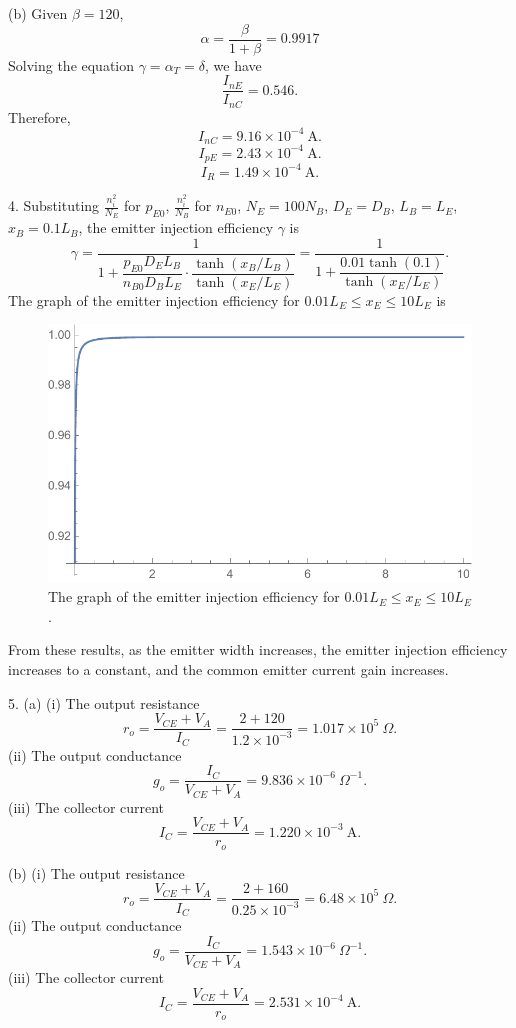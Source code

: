 \documentclass[a4paper]{article}
\begin{document}
(b) Given $\beta=120$,
$$\alpha=\frac{\beta}{1+\beta}=0.9917$$
Solving the equation $\gamma=\alpha_T=\delta$, we have
$$\frac{I_{nE}}{I_{nC}}=0.546.$$
Therefore,
$$I_{nC}=9.16\times10^{-4}\ \mathrm{A}.$$
$$I_{pE}=2.43\times10^{-4}\ \mathrm{A}.$$
$$I_R=1.49\times10^{-4}\ \mathrm{A}.$$

4. Substituting $\frac{n_i^2}{N_E}$ for $p_{E0}$, $\frac{n_i^2}{N_B}$ for $n_{E0}$, $N_E=100N_B$, $D_E=D_B$, $L_B=L_E$, $x_B=0.1L_B$, the emitter injection efficiency $\gamma$ is
$$\gamma=\frac{1}{1+\dfrac{p_{E0}D_EL_B}{n_{B0}D_BL_E}\cdot\dfrac{\tanh{(x_B/L_B)}}{\tanh{(x_E/L_E)}}}=\frac{1}{1+\dfrac{0.01\tanh{(0.1)}}{\tanh{(x_E/L_E)}}}.$$
The graph of the emitter injection efficiency for $0.01L_E\leq x_E\leq10L_E$ is
\begin{figure}[H]
    \centering
    \includegraphics[width=1\textwidth]{1.eps}
    \caption{The graph of the emitter injection efficiency for $0.01L_E\leq x_E\leq10L_E$.}
\end{figure}
From these results, as the emitter width increases, the emitter injection efficiency increases to a constant, and the common emitter current gain increases.

5. (a) (i) The output resistance
$$r_o=\frac{V_{CE}+V_A}{I_C}=\frac{2+120}{1.2\times10^{-3}}=1.017\times10^5\ \Omega.$$
(ii) The output conductance
$$g_o=\frac{I_C}{V_{CE}+V_A}=9.836\times10^{-6}\ \Omega^{-1}.$$
(iii) The collector current
$$I_C=\frac{V_{CE}+V_A}{r_o}=1.220\times10^{-3}\ \mathrm{A}.$$

(b) (i) The output resistance
$$r_o=\frac{V_{CE}+V_A}{I_C}=\frac{2+160}{0.25\times10^{-3}}=6.48\times10^5\ \Omega.$$
(ii) The output conductance
$$g_o=\frac{I_C}{V_{CE}+V_A}=1.543\times10^{-6}\ \Omega^{-1}.$$
(iii) The collector current
$$I_C=\frac{V_{CE}+V_A}{r_o}=2.531\times10^{-4}\ \mathrm{A}.$$
\end{document}
